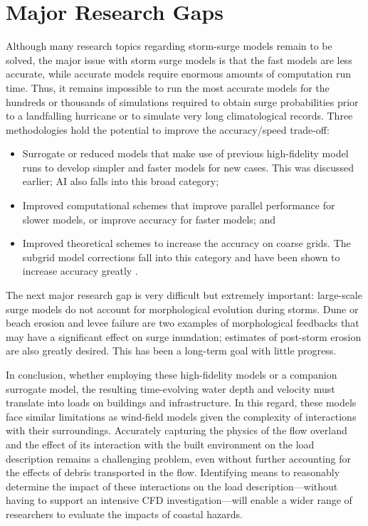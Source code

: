 \section{Major Research Gaps}
\label{sec:storm_surge_gaps}

Although many research topics regarding storm-surge models remain to be solved, the major issue with storm surge models is that the fast models are less accurate, while accurate models require enormous amounts of computation run time. Thus, it remains impossible to run the most accurate models for the hundreds or thousands of simulations required to obtain surge probabilities prior to a landfalling hurricane or to simulate very long climatological records. Three methodologies hold the potential to improve the accuracy/speed trade-off:

\begin{itemize}
    \item Surrogate or reduced models that make use of previous high-fidelity model runs to develop simpler and faster models for new cases. This was discussed earlier; AI also falls into this broad category;
    \item Improved computational schemes that improve parallel performance for slower models, or improve accuracy for faster models; and
    \item Improved theoretical schemes to increase the accuracy on coarse grids. The subgrid model corrections fall into this category and have been shown to increase accuracy greatly \citep{kennedy2019subgrid}.
\end{itemize}

The next major research gap is very difficult but extremely important: large-scale surge models do not account for morphological evolution during storms. Dune or beach erosion and levee failure are two examples of morphological feedbacks that may have a significant effect on surge inundation; estimates of post-storm erosion are also greatly desired. This has been a long-term goal with little progress.

In conclusion, whether employing these high-fidelity models or a companion surrogate model, the resulting time-evolving water depth and velocity must translate into loads on buildings and infrastructure. In this regard, these models face similar limitations as wind-field models given the complexity of interactions with their surroundings. Accurately capturing the physics of the flow overland and the effect of its interaction with the built environment on the load description remains a challenging problem, even without further accounting for the effects of debris transported in the flow. Identifying means to reasonably determine the impact of these interactions on the load description---without having to support an intensive CFD investigation---will enable a wider range of researchers to evaluate the impacts of coastal hazards. 


